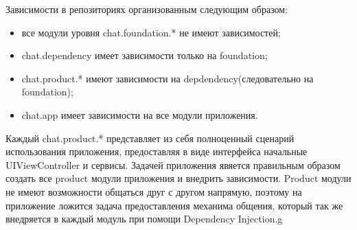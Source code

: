 Зависимости в репозиториях организованным следующим образом: 

\begin{itemize}
\item все модули уровня chat.foundation.* не имеют зависимостей;
\item chat.dependency имеет зависимости только на foundation;
\item chat.product.* имеют зависимости на depdendency(следовательно на foundation);
\item chat.app имеет зависимости на все модули приложения.
\end{itemize}

Каждый chat.product.* представляет из себя полноценный сценарий использования приложения, предоставляя в виде интерфейса начальные UIViewController и сервисы. Задачей приложения явяется правильным образом создать все product модули приложения и внедрить зависимости. Product модули не имеют возможности общаться друг с другом напрямую, поэтому на приложение ложится задача предоставления механима общения, который так же внедряется в каждый модуль при помощи Dependency Injection.g